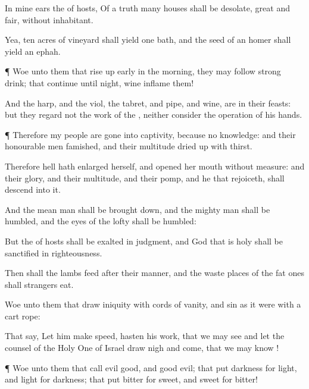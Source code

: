 {In mine
ears
{} the
{} of
hosts, Of a
truth
many
houses shall be
desolate,
{}
great and
fair, without
inhabitant.

Yea,
ten
acres of
vineyard shall
yield
one
bath, and the
seed of an
homer shall
yield an
ephah.


\par }{\PP {}¶
Woe unto them that rise up
early in the
morning,
{} they may
follow strong
drink; that
continue until
night,
{}
wine
inflame them!

And the
harp, and the
viol, the
tabret, and
pipe, and
wine, are in their
feasts: but they
regard not the
work of the
{}, neither
consider the
operation of his
hands.


\par }{\PP {}¶ Therefore my
people are gone into
captivity, because
{} no
knowledge: and their
honourable
men
{}
famished, and their
multitude dried
up with
thirst.

Therefore
hell hath
enlarged
herself, and
opened her
mouth without
measure: and their
glory, and their
multitude, and their
pomp, and he that
rejoiceth, shall
descend into it.

And the mean
man shall be brought
down, and the mighty
man shall be
humbled, and the
eyes of the
lofty shall be
humbled:

But the
{} of
hosts shall be
exalted in
judgment, and
God that is
holy shall be
sanctified in
righteousness.

Then shall the
lambs
feed after their
manner, and the waste
places of the fat
ones shall
strangers
eat.


\par }{\PP {}Woe unto them that
draw
iniquity with
cords of
vanity, and
sin as it were with a
cart
rope:

That
say, Let him make
speed,
{}
hasten his
work, that we may
see
{} and let the
counsel of the Holy
One of
Israel draw
nigh and
come, that we may
know
{}!


\par }{\PP {}¶
Woe unto them that
call
evil
good, and
good
evil; that
put
darkness for
light, and
light for
darkness; that
put
bitter for
sweet, and
sweet for
bitter!

}
